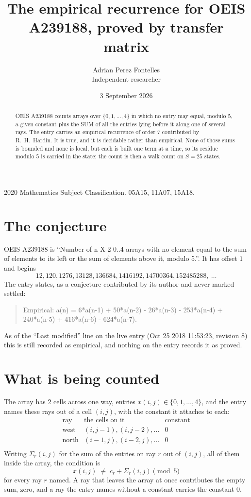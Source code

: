 \documentclass[11pt,a4paper]{article}
\title{The empirical recurrence for OEIS A239188, proved by transfer matrix}
\author{Adrian Perez Fontelles\\ \small Independent researcher}
\date{3 September 2026}
\theoremstyle{plain}
\theoremstyle{definition}
\begin{document}
\maketitle

\begin{abstract}
OEIS A239188 counts arrays over $\{0,1,\dots,4\}$ in which no entry may equal, modulo $5$, a given
constant plus the SUM of all the entries lying before it along one of several rays. The entry
carries an empirical recurrence of order $7$ contributed by R.~H.~Hardin. It is true, and
it is decidable rather than empirical. None of those sums is bounded and none is local, but
each is built one term at a time, so its residue modulo $5$ is carried in the state; the
count is then a walk count on $S=25$ states.
\end{abstract}

\noindent\small 2020 Mathematics Subject Classification. 05A15, 11A07, 15A18.\normalsize

\section{The conjecture}

OEIS A239188 is ``Number of n X 2 0..4 arrays with no element equal to the sum of elements to its left or the sum of elements above it, modulo 5.''. It has offset $1$ and begins
\[
12, 120, 1276, 13128, 136684, 1416192, 14700364, 152485288,\ \dots
\]
The entry states, as a conjecture contributed by its author and never marked settled:
\begin{quote}
Empirical: a(n) = 6*a(n-1) + 50*a(n-2) - 26*a(n-3) - 253*a(n-4) + 240*a(n-5) + 416*a(n-6) - 624*a(n-7).
\end{quote}
As of the ``Last modified'' line on the live entry (Oct 25 2018 11:53:23, revision 8) this is still
recorded as empirical, and nothing on the entry records it as proved.

\section{What is being counted}

The array has $2$ cells across one way, entries $x(i,j)\in\{0,1,\dots,4\}$, and the entry names these
rays out of a cell $(i,j)$, with the constant it attaches to each:
\[
\begin{array}{lll}
\text{ray} & \text{the cells on it} & \text{constant} \\[2pt]
\text{west} & (i,j-1),(i,j-2),\dots & 0 \\
\text{north} & (i-1,j),(i-2,j),\dots & 0 \\
\end{array}
\]
Writing $\Sigma_r(i,j)$ for the sum of the entries on ray $r$ out of $(i,j)$, all of them
inside the array, the condition is
\[
x(i,j)\;\not\equiv\;c_r+\Sigma_r(i,j) \pmod{5}
\]
for every ray $r$ named. A ray that leaves the array at once contributes the empty sum,
zero, and a ray the entry names without a constant carries the constant $0$.
\end{document}
